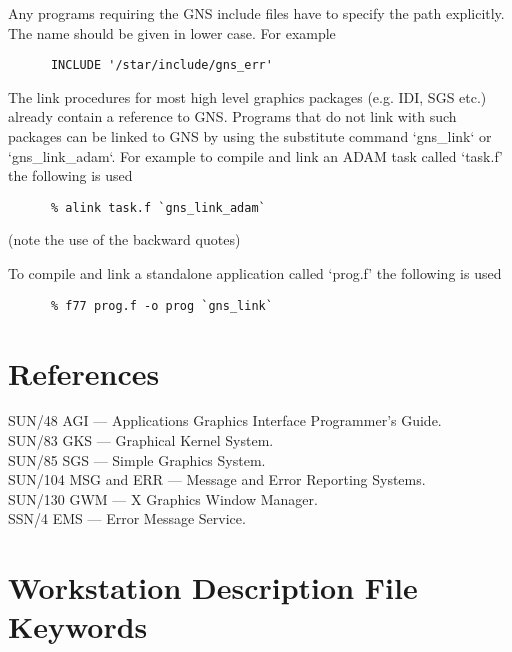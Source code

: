 Any programs requiring the GNS include files have to specify the path
explicitly. The name should be given in lower case. For example
\begin{verbatim}
      INCLUDE '/star/include/gns_err'
\end{verbatim}

The link procedures for most high level graphics packages (e.g. IDI, SGS etc.)
already contain a reference to GNS. Programs that do not link with such
packages can be linked to GNS by using the substitute command `gns\_link`
or `gns\_link\_adam`. For example to compile and link an ADAM task called
`task.f' the following is used
\begin{verbatim}
      % alink task.f `gns_link_adam`
\end{verbatim}
(note the use of the backward quotes)

To compile and link a standalone application called `prog.f' the following
is used
\begin{verbatim}
      % f77 prog.f -o prog `gns_link`
\end{verbatim}

\section{References}\label{ref}

SUN/48 AGI --- Applications Graphics Interface Programmer's Guide.\\
SUN/83 GKS --- Graphical Kernel System.\\
SUN/85 SGS --- Simple Graphics System.\\
SUN/104 MSG and ERR --- Message and Error Reporting Systems.\\
SUN/130 GWM --- X Graphics Window Manager.\\
SSN/4 EMS --- Error Message Service.

\newpage\appendix
\section{Workstation Description File Keywords}\label{key}

